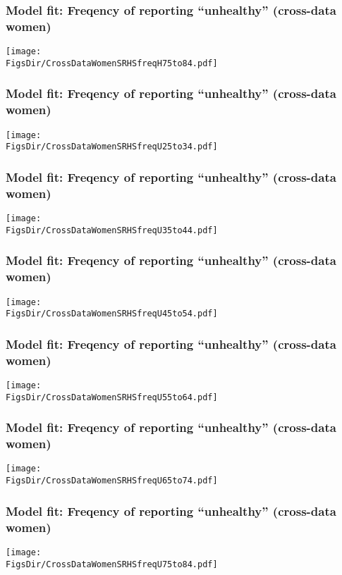 \documentclass[aspectratio=169]{beamer}
\newcommand{\FigsDir}{../Figures}
\begin{document}
\begin{frame}\frametitle{Model fit: Freqency of reporting ``unhealthy'' (cross-data women)}
\begin{center}
	\texttt{[image: \\FigsDir/CrossDataWomenSRHSfreqH75to84.pdf]}
\end{center}
\end{frame}

\begin{frame}\frametitle{Model fit: Freqency of reporting ``unhealthy'' (cross-data women)}
\begin{center}
	\texttt{[image: \\FigsDir/CrossDataWomenSRHSfreqU25to34.pdf]}
\end{center}
\end{frame}

\begin{frame}\frametitle{Model fit: Freqency of reporting ``unhealthy'' (cross-data women)}
\begin{center}
\texttt{[image: \\FigsDir/CrossDataWomenSRHSfreqU35to44.pdf]}
\end{center}
\end{frame}

\begin{frame}\frametitle{Model fit: Freqency of reporting ``unhealthy'' (cross-data women)}
\begin{center}
\texttt{[image: \\FigsDir/CrossDataWomenSRHSfreqU45to54.pdf]}
\end{center}
\end{frame}

\begin{frame}\frametitle{Model fit: Freqency of reporting ``unhealthy'' (cross-data women)}
\begin{center}
\texttt{[image: \\FigsDir/CrossDataWomenSRHSfreqU55to64.pdf]}
\end{center}
\end{frame}

\begin{frame}\frametitle{Model fit: Freqency of reporting ``unhealthy'' (cross-data women)}
\begin{center}
\texttt{[image: \\FigsDir/CrossDataWomenSRHSfreqU65to74.pdf]}
\end{center}
\end{frame}

\begin{frame}\frametitle{Model fit: Freqency of reporting ``unhealthy'' (cross-data women)}
\begin{center}
\texttt{[image: \\FigsDir/CrossDataWomenSRHSfreqU75to84.pdf]}
\end{center}
\end{frame}
\end{document}
